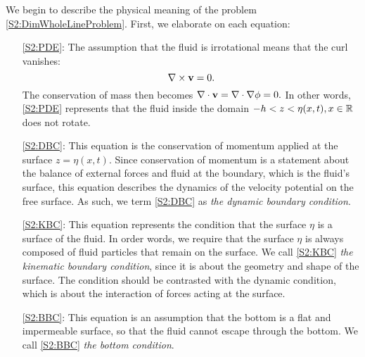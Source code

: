 We begin to describe the physical meaning of the problem \eqref{S2:DimWholeLineProblem}. First, we elaborate on each equation:
\begin{itemize}
\item[\eqref{S2:PDE}:] The assumption that the fluid is irrotational means that the curl vanishes:
\[ \nabla \times {\bf v} = 0. \]
The conservation of mass then becomes $ \nabla \cdot {\bf v} = \nabla \cdot \nabla \phi = 0.$ In other words, \eqref{S2:PDE} represents that the fluid inside the domain $-h < z < \eta(x,t), x \in \mathbb R$ does not rotate.  
\item[\eqref{S2:DBC}:] This equation is the conservation of momentum applied at the surface $z = \eta(x,t).$ Since conservation of momentum is a statement about the balance of external forces and fluid at the boundary, which is the fluid's surface, this equation describes the dynamics of the velocity potential on the free surface. As such, we term \eqref{S2:DBC} as \textit{the dynamic boundary condition}.
\item[\eqref{S2:KBC}:] This equation represents the condition that the surface $\eta$ is a surface of the fluid. In order words, we require that the surface $\eta$ is always composed of 
fluid particles that remain on the surface. We call \eqref{S2:KBC} \textit{the kinematic boundary condition}, since it is about the geometry and shape of the surface. The condition should be contrasted with the dynamic condition, which is about the interaction of forces acting at the surface. 
\item[\eqref{S2:BBC}:] This equation is an assumption that the bottom is a flat and impermeable surface, so that the fluid cannot escape through the bottom. We call \eqref{S2:BBC} \textit{the bottom condition}. 
\end{itemize}

